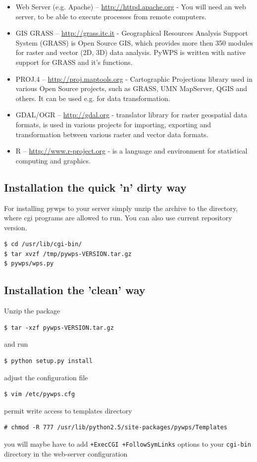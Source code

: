 \documentclass[a4paper,11pt]{article}
\begin{document}
\begin{itemize}
    \item Web Server (e.g. Apache) -- \url{http://httpd.apache.org} -  You
    will need an web server, to be able to execute processes from remote
    computers.

    \item GIS GRASS  -- \url{http://grass.itc.it} - Geographical Resources
    Analysis Support System (GRASS) is Open Source GIS, which provides more
    then 350 modules for raster and vector (2D, 3D) data analysis. PyWPS is
    written with native support for GRASS and it's functions.

    \item PROJ.4  -- \url{http://proj.maptools.org} - Cartographic
    Projections library used in various Open Source projects, such as
    GRASS, UMN MapServer, QGIS and others. It can be used e.g. for data
    transformation.

    \item GDAL/OGR  -- \url{http://gdal.org} - translator library for
    raster geospatial data formats, is used in various projects for
    importing, exporting and transformation between various raster and vector
    data formats.

    \item R  -- \url{http://www.r-project.org} - is a language and environment
    for statistical computing and graphics.

\end{itemize}
    
\subsection{Installation the quick 'n' dirty way}
For installing pywps to your server simply unzip the archive to the
directory, where cgi programs are allowed to run. You can also use current
repository version.

\begin{verbatim}
$ cd /usr/lib/cgi-bin/
$ tar xvzf /tmp/pywps-VERSION.tar.gz
$ pywps/wps.py
\end{verbatim}

\subsection{Installation the 'clean' way}
Unzip the package 
\begin{verbatim}
$ tar -xzf pywps-VERSION.tar.gz
\end{verbatim}
and run 
\begin{verbatim}
$ python setup.py install
\end{verbatim} 
adjust the configuration file 
\begin{verbatim}
$ vim /etc/pywps.cfg
\end{verbatim} 
permit write access to templates directory
\begin{verbatim}
# chmod -R 777 /usr/lib/python2.5/site-packages/pywps/Templates
\end{verbatim} 
you will maybe have to add \texttt{+ExecCGI +FollowSymLinks} options to
your \texttt{cgi-bin} directory in the web-server configuration
\end{document}
